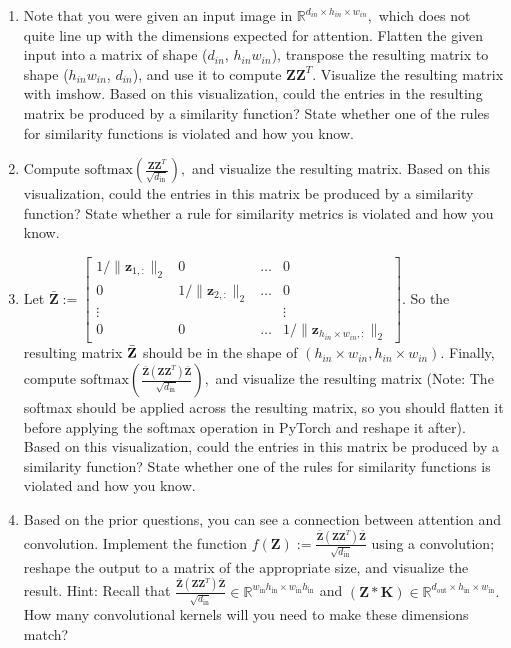 \documentclass{exam}
\begin{document}
\begin{enumerate}
    \item Note that you were given an input image in $\mathbb{R}^{d_{in} \times h_{in} \times w_{in}},$ which does not quite line up with the dimensions expected for attention. Flatten the given input into a matrix of shape ($d_{in}$, $h_{in}w_{in}$), transpose the resulting matrix to shape ($h_{in}w_{in}$, $d_{in}$), and use it to compute $\mathbf{Z}\mathbf{Z}^T.$ Visualize the resulting matrix with imshow. Based on this visualization, could the entries in the resulting matrix be produced by a similarity function? State whether one of the rules for similarity functions is violated and how you know.
    \item Compute $\text{softmax} \left( 
    \frac{\mathbf{Z}\mathbf{Z}^T}{\sqrt{d_{\text{in}}}}\right),$ and visualize the resulting matrix. Based on this visualization, could the entries in this matrix be produced by a similarity function? State whether a rule for similarity metrics is violated and how you know.
    \item Let $\bar{\mathbf{Z}}:=\begin{bmatrix}
        1/\|\mathbf{z}_{1, :}\|_2 & 0 & \hdots & 0\\
        0 & 1/\|\mathbf{z}_{2, :}\|_2 & \hdots & 0\\
        \vdots & & & \vdots\\
        0 & 0 & \hdots & 1/\|\mathbf{z}_{ h_{in} \times w_{in}, :}\|_2
    \end{bmatrix}.$ So the resulting matrix $\Bar{\mathbf{Z}}$ should be in the shape of $(h_{in} \times w_{in}, h_{in} \times w_{in})$. Finally, compute $\text{softmax}\left( 
    \frac{\bar{\mathbf{Z}}(\mathbf{Z}\mathbf{Z}^T) \bar{\mathbf{Z}}}{\sqrt{d_{\text{in}}}}\right),$ and visualize the resulting matrix (Note: The softmax should be applied across the resulting matrix, so you should flatten it before applying the softmax operation in PyTorch and reshape it after). Based on this visualization, could the entries in this matrix be produced by a similarity function? State whether one of the rules for similarity functions is violated and how you know.

    \item Based on the prior questions, you can see a connection between attention and convolution. Implement the function $f(\mathbf{Z}) := \frac{\bar{\mathbf{Z}}(\mathbf{Z}\mathbf{Z}^T) \bar{\mathbf{Z}}}{\sqrt{d_{\text{in}}}}$ using a convolution; reshape the output to a matrix of the appropriate size, and visualize the result. Hint: Recall that $
    \frac{\bar{\mathbf{Z}}(\mathbf{Z}\mathbf{Z}^T) \bar{\mathbf{Z}}}{\sqrt{d_{\text{in}}}} \in \mathbb{R}^{w_{\text{in}}h_{\text{in}} \times w_{\text{in}}h_{\text{in}}}$ and $(\mathbf{Z} * \mathbf{K}) \in \mathbb{R}^{d_{\text{out}} \times h_{\text{in}} \times w_{\text{in}}}.$ How many convolutional kernels will you need to make these dimensions match?
\end{enumerate}
\end{document}
